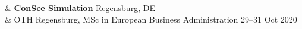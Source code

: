 %
{\color{gray}{Talks and tutorials}} 
& \textbf{ConSce Simulation} \hfill Regensburg, DE \\
& OTH Regensburg, MSc in European Business Administration \hfill 29--31 Oct 2020 \\

